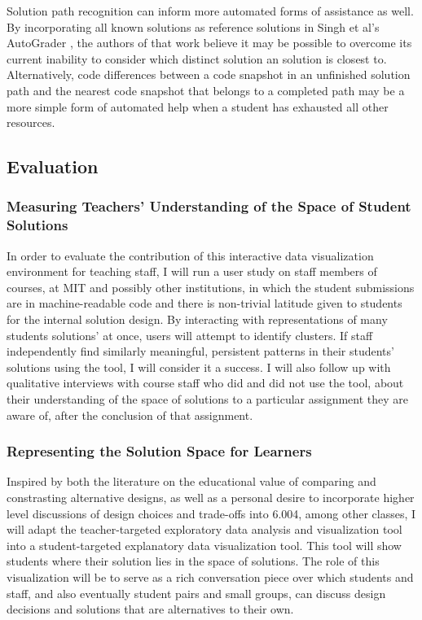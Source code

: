 \documentclass[12pt]{article}
\begin{document}

Solution path recognition can inform more automated forms of assistance as well. By incorporating all known solutions as reference solutions in Singh et al's AutoGrader \cite{rishabh}, the authors of that work believe it may be possible to overcome its current inability to consider which distinct solution an solution is closest to. Alternatively, code differences between a code snapshot in an unfinished solution path and the nearest code snapshot that belongs to a completed path may be a more simple form of automated help when a student has exhausted all other resources. %

\subsection{Evaluation}

\subsubsection{Measuring Teachers' Understanding of the Space of Student Solutions}

In order to evaluate the contribution of this interactive data visualization environment for teaching staff, I will run a user study on staff members of courses, at MIT and possibly other institutions, in which the student submissions are in machine-readable code and there is non-trivial latitude given to students for the internal solution design. By interacting with representations of many students solutions' at once, users will attempt to identify clusters. If staff independently find similarly meaningful, persistent patterns in their students' solutions using the tool, I will consider it a success. I will also follow up with qualitative interviews with course staff who did and did not use the tool, about their understanding of the space of solutions to a particular assignment they are aware of, after the conclusion of that assignment.

\subsubsection{Representing the Solution Space for Learners}

Inspired by both the literature on the educational value of comparing and constrasting alternative designs, as well as a personal desire to incorporate higher level discussions of design choices and trade-offs into 6.004, among other classes, I will adapt the teacher-targeted exploratory data analysis and visualization tool into a student-targeted explanatory data visualization tool. This tool will show students where their solution lies in the space of solutions. The role of this visualization will be to serve as a rich conversation piece over which students and staff, and also eventually student pairs and small groups, can discuss design decisions and solutions that are alternatives to their own. 
\end{document}
